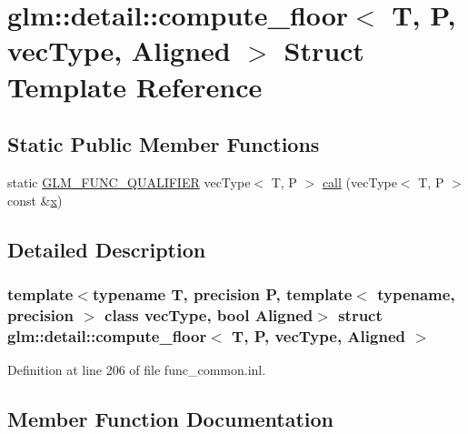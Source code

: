 \hypertarget{structglm_1_1detail_1_1compute__floor}{}\section{glm\+::detail\+::compute\+\_\+floor$<$ T, P, vec\+Type, Aligned $>$ Struct Template Reference}
\label{structglm_1_1detail_1_1compute__floor}
\subsection*{Static Public Member Functions}
\begin{DoxyCompactItemize}
\item 
static \mbox{\hyperlink{setup_8hpp_a33fdea6f91c5f834105f7415e2a64407}{G\+L\+M\+\_\+\+F\+U\+N\+C\+\_\+\+Q\+U\+A\+L\+I\+F\+I\+ER}} vec\+Type$<$ T, P $>$ \mbox{\hyperlink{structglm_1_1detail_1_1compute__floor_a69eaf4fee35fffb74bcf8ad3a2beb2d6}{call}} (vec\+Type$<$ T, P $>$ const \&\mbox{\hyperlink{glad_8h_a92d0386e5c19fb81ea88c9f99644ab1d}{x}})
\end{DoxyCompactItemize}


\subsection{Detailed Description}
\subsubsection*{template$<$typename T, precision P, template$<$ typename, precision $>$ class vec\+Type, bool Aligned$>$\newline
struct glm\+::detail\+::compute\+\_\+floor$<$ T, P, vec\+Type, Aligned $>$}



Definition at line 206 of file func\+\_\+common.\+inl.



\subsection{Member Function Documentation}
\mbox{\label{structglm_1_1detail_1_1compute__floor_a69eaf4fee35fffb74bcf8ad3a2beb2d6}} 
